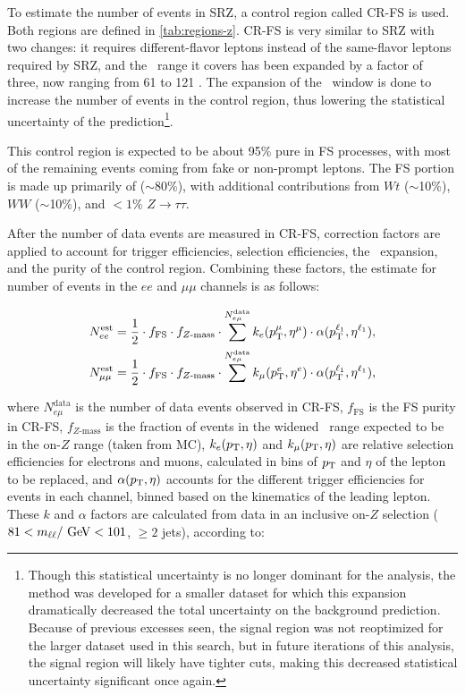 To estimate the number of events in SRZ, a control region called CR-FS is used. Both regions are defined in \autoref{tab:regions-z}. CR-FS is very similar to SRZ with two changes: it requires different-flavor leptons instead of the same-flavor leptons required by SRZ, and the \mll~range it covers has been expanded by a factor of three, now ranging from 61 to 121 \gev. The expansion of the \mll~window is done to increase the number of events in the control region, thus lowering the statistical uncertainty of the prediction\footnote{Though this statistical uncertainty is no longer dominant for the analysis, the method was developed for a smaller dataset for which this expansion dramatically decreased the total uncertainty on the background prediction. \cite{zmet} Because of previous excesses seen, the signal region was not reoptimized for the larger dataset used in this search, but in future iterations of this analysis, the signal region will likely have tighter cuts, making this decreased statistical uncertainty significant once again.}. 

This control region is expected to be about 95\% pure in \ac{FS} processes, with most of the remaining events coming from fake or non-prompt leptons. The \ac{FS} portion is made up primarily of \ttbar ($\sim$80\%), with additional contributions from $Wt$ ($\sim$10\%), $WW$ ($\sim$10\%), and $<1$\% $Z \rightarrow \tau\tau$. 

After the number of data events are measured in CR-FS, correction factors are applied to account for trigger efficiencies, selection efficiencies, the \mll~expansion, and the purity of the control region. Combining these factors, the estimate for number of events in the $ee$ and $\mu\mu$ channels is as follows:

\begin{eqnarray}
N_{ee}^\text{est} = \frac{1}{2} \cdot  f_{\mathrm{FS}} \cdot f_{Z \mathrm{\text{-}mass}} \cdot\sum^{N_{e\mu}^\text{data}} k_{e}(p_{\text{T}}^{\mu}, \eta^{\mu})\cdot \alpha(p_{\text{T}}^{\ell_1}, \eta^{\ell_1}) ,\\
N_{\mu\mu}^\text{est} = \frac{1}{2} \cdot  f_{\mathrm{FS}} \cdot f_{Z \mathrm{\text{-}mass}} \cdot \sum^{N_{e\mu}^\text{data}}k_{\mu}(p_{\text{T}}^{e}, \eta^{e})\cdot \alpha(p_{\text{T}}^{\ell_1}, \eta^{\ell_1}) ,
\end{eqnarray}

\noindent where $N_{e\mu}^\text{data}$ is the number of data events observed in CR-FS, 
$f_{\mathrm{FS}}$ is the \ac{FS} purity in CR-FS,  
$f_{Z \mathrm{\text{-}mass}}$ is the fraction of events in the widened \mll~range expected to be in the on-$Z$ range (taken from \ttbar \ac{MC}),
$k_{e}(p_{\text{T}}, \eta)$ and $k_{\mu}(p_{\text{T}}, \eta)$ are relative selection efficiencies for electrons and muons, calculated in bins of $p_{\text{T}}$ and $\eta$ of the lepton to be replaced, 
and $\alpha(p_{\text{T}}, \eta)$ accounts for the different trigger efficiencies for events in each channel, binned based on the kinematics of the leading lepton. These $k$ and $\alpha$ factors are calculated from data in an inclusive on-$Z$ selection ($81<\mll/\GeV<101$, $\geq2$ jets), 
according to:

